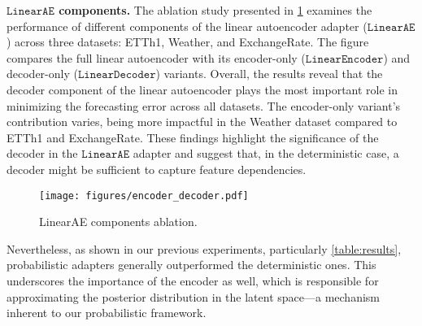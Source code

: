 \noindent\textbf{$\texttt{LinearAE}$ components.} The ablation study presented in \cref{fig:enc_dec} examines the performance of different components of the linear autoencoder adapter ($\texttt{LinearAE}$) across three datasets: ETTh1, Weather, and ExchangeRate. The figure compares the full linear autoencoder with its encoder-only ($\texttt{LinearEncoder}$) and decoder-only ($\texttt{LinearDecoder}$) variants. Overall, the results reveal that the decoder component of the linear autoencoder plays the most important role in minimizing the forecasting error across all datasets. The encoder-only variant's contribution varies, being more impactful in the Weather dataset compared to ETTh1 and ExchangeRate. These findings highlight the significance of the decoder in the $\texttt{LinearAE}$ adapter and suggest that, in the deterministic case, a decoder might be sufficient to capture feature dependencies. 

\begin{figure}[ht]
\centering
\texttt{[image: figures/encoder\_decoder.pdf]}
\caption{LinearAE components ablation.}
\label{fig:enc_dec}
\end{figure}

Nevertheless, as shown in our previous experiments, particularly \cref{table:results}, probabilistic adapters generally outperformed the deterministic ones. This underscores the importance of the encoder as well, which is responsible for approximating the posterior distribution in the latent space—a mechanism inherent to our probabilistic framework.

